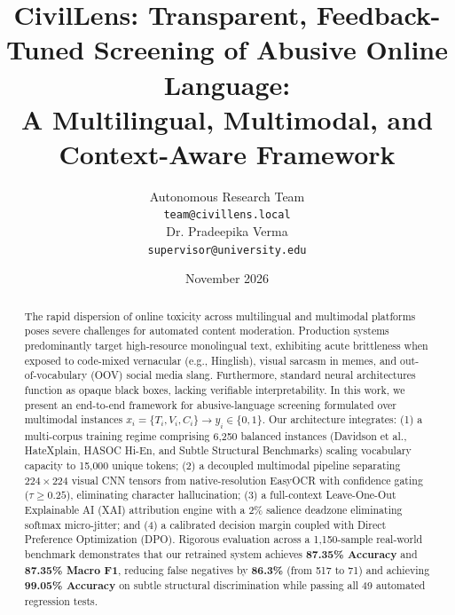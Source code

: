 \documentclass[11pt]{article}
\title{CivilLens: Transparent, Feedback-Tuned Screening of Abusive Online Language: \\ A Multilingual, Multimodal, and Context-Aware Framework}
\author{
  Autonomous Research Team \\
  \texttt{team@civillens.local} \\
  \And
  Dr. Pradeepika Verma \\
  \texttt{supervisor@university.edu}
}
\date{November 2026}
\begin{document}
\maketitle

\begin{abstract}
The rapid dispersion of online toxicity across multilingual and multimodal platforms poses severe challenges for automated content moderation. Production systems predominantly target high-resource monolingual text, exhibiting acute brittleness when exposed to code-mixed vernacular (e.g., Hinglish), visual sarcasm in memes, and out-of-vocabulary (OOV) social media slang. Furthermore, standard neural architectures function as opaque black boxes, lacking verifiable interpretability. In this work, we present an end-to-end framework for abusive-language screening formulated over multimodal instances $x_i = \{T_i, V_i, C_i\} \to y_i \in \{0, 1\}$. Our architecture integrates: (1) a multi-corpus training regime comprising 6,250 balanced instances (Davidson et al., HateXplain, HASOC Hi-En, and Subtle Structural Benchmarks) scaling vocabulary capacity to 15,000 unique tokens; (2) a decoupled multimodal pipeline separating $224 \times 224$ visual CNN tensors from native-resolution EasyOCR with confidence gating ($\tau \ge 0.25$), eliminating character hallucination; (3) a full-context Leave-One-Out Explainable AI (XAI) attribution engine with a 2\% salience deadzone eliminating softmax micro-jitter; and (4) a calibrated decision margin coupled with Direct Preference Optimization (DPO). Rigorous evaluation across a 1,150-sample real-world benchmark demonstrates that our retrained system achieves \textbf{87.35\% Accuracy} and \textbf{87.35\% Macro F1}, reducing false negatives by \textbf{86.3\%} (from 517 to 71) and achieving \textbf{99.05\% Accuracy} on subtle structural discrimination while passing all 49 automated regression tests.
\end{abstract}
\end{document}
